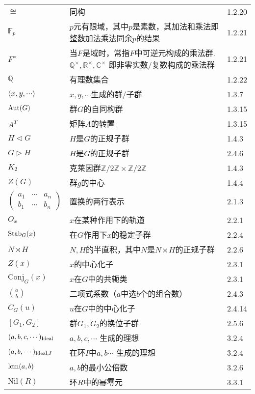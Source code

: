 \begin{longtable}{lp{.6\linewidth}l}
	$\cong$ & 同构 & 1.2.20\\
	$\mathbb{F}_p$ & $p$元有限域，其中$p$是素数，其加法和乘法即整数加法乘法同余$p$的结果 & 1.2.21\\
	$F^{\times}$ & 当$F$是域时，常指$F$中可逆元构成的乘法群. $\mathbb{Q}^{\times}, \mathbb{R}^{\times}, \mathbb{C}^{\times}$ 即非零实数/复数构成的乘法群 & 1.2.21\\
	$\mathbb{Q}$ & 有理数集合 & 1.2.22 \\
	$\langle x,y,\cdots \rangle$ & $x,y,\cdots$生成的群/子群 & 1.3.7\\
	$\operatorname{Aut}(G)$ & 群$G$的自同构群 & 1.3.15\\
	$A^T$ & 矩阵$A$的转置 & 1.3.15\\
	$H\vartriangleleft G$ & $H$是$G$的正规子群 & 1.4.3\\
	$G\vartriangleright H$ & $H$是$G$的正规子群 & 2.4.6\\
	$K_2$ & 克莱因群$\mathbb{Z}/2\mathbb{Z}\times\mathbb{Z}/2\mathbb{Z}$ & 1.4.3\\
	$Z(G)$ & 群$g$的中心 & 1.4.4\\
	$\begin{pmatrix}
		a_1 & \cdots & a_n\\
		b_1 & \cdots & b_n
	\end{pmatrix}$ & 置换的两行表示 & 2.1.3\\
	$O_x$ & $x$在某种作用下的轨道 & 2.2.1\\
	$\operatorname{Stab}_G(x)$ & 在$G$作用下$x$的稳定子群 & 2.2.4\\
	$N\rtimes H$ & $N,H$的半直积，其中$N$是$N\rtimes H$的正规子群 & 2.2.6\\
	$Z(x)$ & $x$的中心化子& 2.3.1\\
	$\mathrm{Conj}_G(x)$ & $x$在$G$中的共轭类 & 2.3.1\\
	$\binom{a}{b}$ & 二项式系数（$a$中选$b$个的组合数） & 2.4.3\\
	$C_G(u)$ & $u$在$G$中的中心化子 & 2.4.14\\
	$[G_1, G_2]$ & 群$G_1, G_2$的换位子群 & 2.5.6\\
	$(a,b,c,\cdots)_{\operatorname{Ideal}}$ & $a,b,c,\cdots$ 生成的理想 & 3.2.4\\
	$(a,b,\cdots)_{\operatorname{Ideal}, I}$ & 在环$I$中$a,b\cdots$ 生成的理想 & 3.2.4\\
	$\operatorname{lcm}(a,b)$ & $a,b$的最小公倍数 & 3.2.6\\
	$\mathrm{Nil}(R)$ & 环$R$中的幂零元 & 3.3.1\\
	
\end{longtable}
